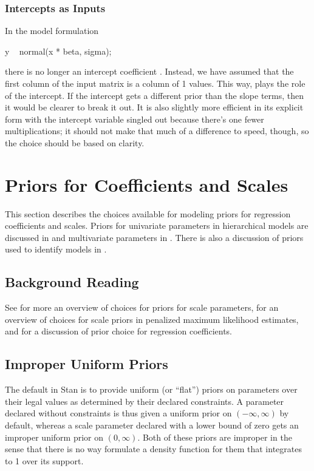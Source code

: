 \subsubsection{Intercepts as Inputs}

In the model formulation
%
\begin{stancode}
  y ~ normal(x * beta, sigma);
\end{stancode}
%
there is no longer an intercept coefficient .  Instead, we
have assumed that the first column of the input matrix  is a
column of 1 values.  This way,  plays the role of the
intercept.  If the intercept gets a different prior than the slope
terms, then it would be clearer to break it out.  It is also slightly
more efficient in its explicit form with the intercept variable
singled out because there's one fewer multiplications; it should not
make that much of a difference to speed, though, so the choice should
be based on clarity.


\section{Priors for Coefficients and Scales}\label{regression-priors.section}

This section describes the choices available for modeling priors for
regression coefficients and scales.  Priors for univariate parameters
in hierarchical models are discussed in
 and multivariate parameters in
. There is also a
discussion of priors used to identify models in
.

\subsection{Background Reading}

See \citep{Gelman:2006} for more an overview of choices for priors for
scale parameters, \citep{ChungEtAl:2013} for an overview of choices
for scale priors in penalized maximum likelihood estimates, and
\cite{GelmanJakulinPittauEtAl:2008} for a discussion of prior choice
for regression coefficients.

\subsection{Improper Uniform Priors}

The default in Stan is to provide uniform (or ``flat'') priors on
parameters over their legal values as determined by their declared
constraints.  A parameter declared without constraints is thus given a
uniform prior on $(-\infty,\infty)$ by default, whereas a scale
parameter declared with a lower bound of zero gets an improper uniform
prior on $(0,\infty)$.  Both of these priors are improper in the sense
that there is no way formulate a density function for them that
integrates to 1 over its support.

